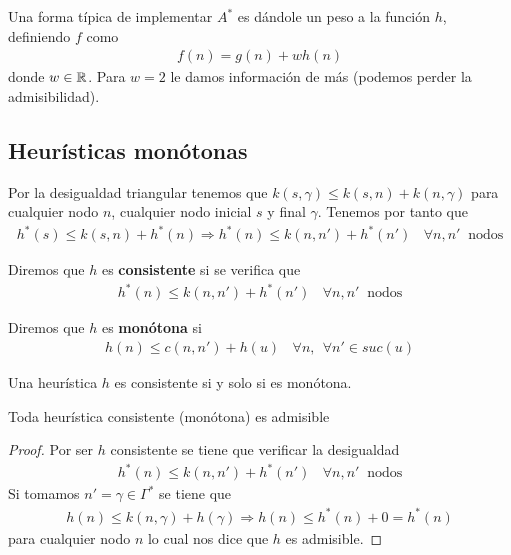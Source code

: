 Una forma típica de implementar $A^*$ es dándole un peso a la función $h$, definiendo $f$ como 
\begin{gather*}
    f(n) = g(n) + wh(n)
\end{gather*}
donde $w\in \mathbb{R}$. Para $w=2$ le damos información de más (podemos perder la admisibilidad). 


\subsection{Heurísticas monótonas}

Por la desigualdad triangular tenemos que $k(s,\gamma) \leq k(s,n) + k(n, \gamma)$ para cualquier nodo $n$, cualquier nodo inicial $s$ y final $\gamma$. Tenemos por tanto que 
\begin{gather*}
    h^*(s) \leq k(s,n) + h^*(n) \Rightarrow h^*(n) \leq k(n,n') + h^*(n') \ \ \ \ \forall n,n' \ \text{ nodos}
\end{gather*}
\begin{definicion}
    Diremos que $h$ es \textbf{consistente} si se verifica que 
    \begin{gather*}
        h^*(n) \leq k(n,n') + h^*(n') \ \ \ \ \forall n,n' \ \text{ nodos}
    \end{gather*}
\end{definicion}

\begin{definicion}
    Diremos que $h$ es \textbf{monótona} si
    \begin{gather*}
        h(n)\leq c(n,n')+h(u) \ \ \ \ \forall n,\ \ \forall n'\in suc(u)
    \end{gather*}
\end{definicion}

\begin{prop}
    Una heurística $h$ es consistente si y solo si es monótona.
\end{prop}

\begin{teo}
    Toda heurística consistente (monótona) es admisible
    \begin{proof}
        Por ser $h$ consistente se tiene que verificar la desigualdad
        \begin{gather*}
            h^*(n) \leq k(n,n') + h^*(n') \ \ \ \ \forall n,n' \ \text{ nodos}
        \end{gather*}
        Si tomamos $n'=\gamma \in \Gamma^*$ se tiene que 
        \begin{gather*}
            h(n) \leq k(n,\gamma) + h(\gamma) \Rightarrow h(n) \leq h^*(n) + 0 = h^*(n)
        \end{gather*}
        para cualquier nodo $n$ lo cual nos dice que $h$ es admisible.
    \end{proof}
\end{teo}

